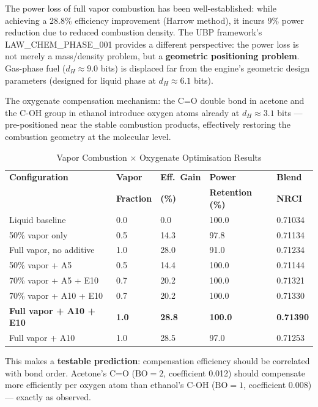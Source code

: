 \documentclass[12pt,a4paper]{article}
\begin{document}
The power loss of full vapor combustion has been well-established: while achieving a
28.8\% efficiency improvement (Harrow method), it incurs 9\% power reduction due to
reduced combustion density. The UBP framework's LAW\_CHEM\_PHASE\_001 provides a
different perspective: the power loss is not merely a mass/density problem, but a
\textbf{geometric positioning problem}. Gas-phase fuel ($d_H \approx 9.0$ bits) is
displaced far from the engine's geometric design parameters (designed for liquid phase
at $d_H \approx 6.1$ bits).

The oxygenate compensation mechanism: the C=O double bond in acetone and the C-OH
group in ethanol introduce oxygen atoms already at $d_H \approx 3.1$ bits ---
pre-positioned near the stable combustion products, effectively restoring the
combustion geometry at the molecular level.

\begin{table}[H]
\centering
\caption{Vapor Combustion $\times$ Oxygenate Optimisation Results}
\label{tab:vapor}
\begin{tabular}{@{}L{4.8cm} C{1.6cm} C{1.6cm} C{2.6cm} C{2.0cm}@{}}
\toprule
\textbf{Configuration} & \textbf{Vapor} & \textbf{Eff.\ Gain} & \textbf{Power} & \textbf{Blend} \\
& \textbf{Fraction} & \textbf{(\%)} & \textbf{Retention (\%)} & \textbf{NRCI} \\
\midrule
Liquid baseline & 0.0 & 0.0 & 100.0 & 0.71034 \\
50\% vapor only & 0.5 & 14.3 & 97.8 & 0.71134 \\
Full vapor, no additive & 1.0 & 28.0 & 91.0 & 0.71234 \\
50\% vapor + A5 & 0.5 & 14.4 & 100.0 & 0.71144 \\
70\% vapor + A5 + E10 & 0.7 & 20.2 & 100.0 & 0.71321 \\
70\% vapor + A10 + E10 & 0.7 & 20.2 & 100.0 & 0.71330 \\
\textbf{Full vapor + A10 + E10} & \textbf{1.0} & \textbf{28.8} & \textbf{100.0} & \textbf{0.71390} \\
Full vapor + A10 & 1.0 & 28.5 & 97.0 & 0.71253 \\
\bottomrule
\end{tabular}
\end{table}

This makes a \textbf{testable prediction}: compensation efficiency should be correlated
with bond order. Acetone's C=O ($\text{BO}=2$, coefficient 0.012) should compensate
more efficiently per oxygen atom than ethanol's C-OH ($\text{BO}=1$, coefficient 0.008)
--- exactly as observed.
\end{document}
